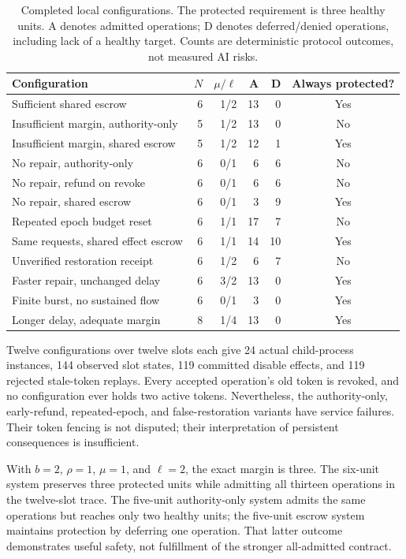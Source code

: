 \begin{table}[t]
\centering\small
\caption{Completed local configurations. The protected requirement is three healthy units. A denotes admitted operations; D denotes deferred/denied operations, including lack of a healthy target. Counts are deterministic protocol outcomes, not measured AI risks.}
\label{tab:demo}
\begin{tabularx}{\linewidth}{@{}Xrrrrc@{}}
\toprule
Configuration & $N$ & $\mu/\ell$ & A & D & Always protected?\\\midrule
Sufficient shared escrow &6&1/2&13&0&Yes\\
Insufficient margin, authority-only &5&1/2&13&0&No\\
Insufficient margin, shared escrow &5&1/2&12&1&Yes\\
No repair, authority-only &6&0/1&6&6&No\\
No repair, refund on revoke &6&0/1&6&6&No\\
No repair, shared escrow &6&0/1&3&9&Yes\\
Repeated epoch budget reset &6&1/1&17&7&No\\
Same requests, shared effect escrow &6&1/1&14&10&Yes\\
Unverified restoration receipt &6&1/2&6&7&No\\
Faster repair, unchanged delay &6&3/2&13&0&Yes\\
Finite burst, no sustained flow &6&0/1&3&0&Yes\\
Longer delay, adequate margin &8&1/4&13&0&Yes\\\bottomrule
\end{tabularx}
\end{table}

Twelve configurations over twelve slots each give 24 actual child-process instances, 144 observed slot states, 119 committed disable effects, and 119 rejected stale-token replays. Every accepted operation's old token is revoked, and no configuration ever holds two active tokens. Nevertheless, the authority-only, early-refund, repeated-epoch, and false-restoration variants have service failures. Their token fencing is not disputed; their interpretation of persistent consequences is insufficient.

With $b=2$, $\rho=1$, $\mu=1$, and $\ell=2$, the exact margin is three. The six-unit system preserves three protected units while admitting all thirteen operations in the twelve-slot trace. The five-unit authority-only system admits the same operations but reaches only two healthy units; the five-unit escrow system maintains protection by deferring one operation. That latter outcome demonstrates useful safety, not fulfillment of the stronger all-admitted contract.


